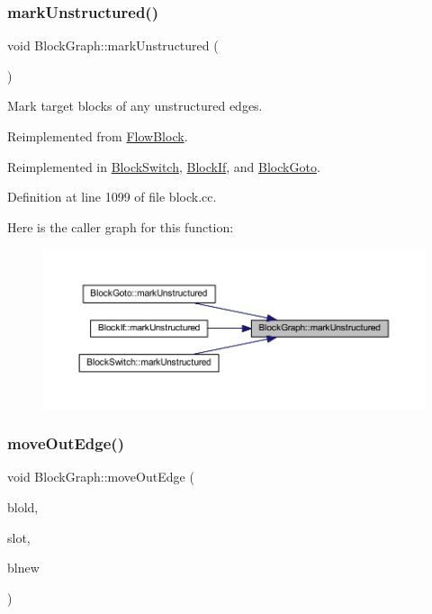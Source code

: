 \subsubsection{\texorpdfstring{markUnstructured()}{markUnstructured()}}
{\footnotesize\ttfamily void Block\+Graph\+::mark\+Unstructured (\begin{DoxyParamCaption}\item[{void}]{ }\end{DoxyParamCaption})\hspace{0.3cm}{\ttfamily [virtual]}}



Mark target blocks of any unstructured edges. 



Reimplemented from \mbox{\hyperlink{class_flow_block_ad06e84d3405ffe52bc29837265402d78}{Flow\+Block}}.



Reimplemented in \mbox{\hyperlink{class_block_switch_ac0f9b63b617ff225b3240f8dda6cf56b}{Block\+Switch}}, \mbox{\hyperlink{class_block_if_a7e394df8ba02a9ba48bd9ec239e84d52}{Block\+If}}, and \mbox{\hyperlink{class_block_goto_acc562547e24a946794c7583e61208553}{Block\+Goto}}.



Definition at line 1099 of file block.\+cc.

Here is the caller graph for this function\+:
\nopagebreak
\begin{figure}[H]
\begin{center}
\leavevmode
\includegraphics[width=350pt]{class_block_graph_a6047a66449b05bf62b33a2bef8642033_icgraph}
\end{center}
\end{figure}
\mbox{\label{class_block_graph_a4a1dcf88374cbf4b9886d26dced7c533}} 
\subsubsection{\texorpdfstring{moveOutEdge()}{moveOutEdge()}}
{\footnotesize\ttfamily void Block\+Graph\+::move\+Out\+Edge (\begin{DoxyParamCaption}\item[{\mbox{\hyperlink{class_flow_block}{Flow\+Block}} $\ast$}]{blold,  }\item[{int4}]{slot,  }\item[{\mbox{\hyperlink{class_flow_block}{Flow\+Block}} $\ast$}]{blnew }\end{DoxyParamCaption})}



